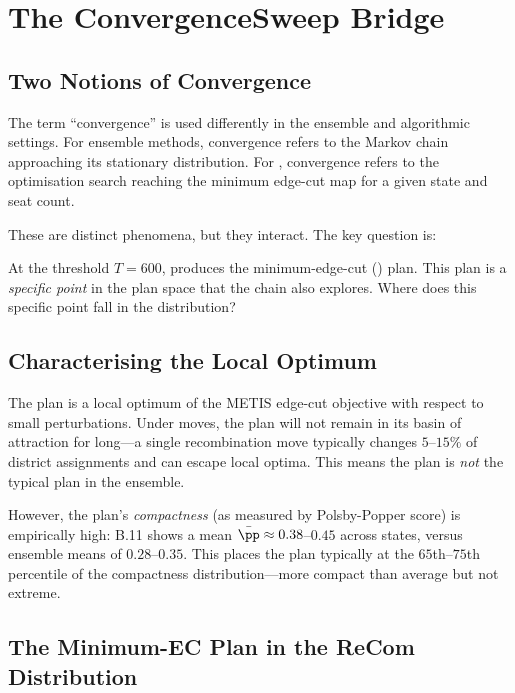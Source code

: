 \section{The ConvergenceSweep Bridge}
\label{sec:bridge}

\subsection{Two Notions of Convergence}

The term ``convergence'' is used differently in the ensemble and algorithmic
settings.  For ensemble methods, convergence refers to the Markov chain
approaching its stationary distribution.  For \cs{} \citep{dellaLibera2026b16},
convergence refers to the optimisation search reaching the minimum edge-cut
map for a given state and seat count.

These are distinct phenomena, but they interact.  The key question is:

\begin{keybox}
At the threshold $T = 600$, \cs{} produces the minimum-edge-cut (\ar{}) plan.
This plan is a \emph{specific point} in the plan space that the \recom{} chain
also explores.  Where does this specific point fall in the \recom{} distribution?
\end{keybox}

\subsection{Characterising the Local Optimum}

The \ar{} plan is a local optimum of the METIS edge-cut objective with
respect to small perturbations.  Under \recom{} moves, the plan will not
remain in its basin of attraction for long---a single recombination move
typically changes $5$--$15\%$ of district assignments and can escape local
optima.  This means the \ar{} plan is \emph{not} the typical plan in the
\recom{} ensemble.

However, the \ar{} plan's \emph{compactness} (as measured by Polsby-Popper
score) is empirically high: B.11 shows a mean $\bar\pp \approx 0.38$--$0.45$
across states, versus \recom{} ensemble means of $0.28$--$0.35$.  This
places the \ar{} plan typically at the $65$th--$75$th percentile of the
\recom{} compactness distribution---more compact than average but not extreme.

\subsection{The Minimum-EC Plan in the ReCom Distribution}

